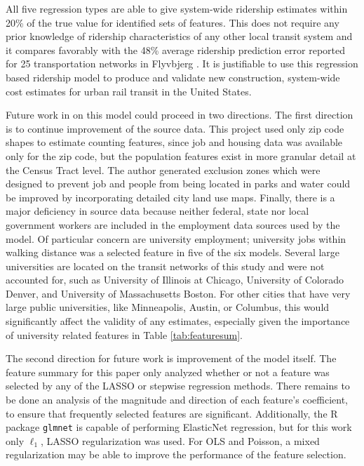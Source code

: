 \documentclass[11pt]{article}
\begin{document}
All five regression types are able to give system-wide ridership estimates within 20\% of the true value for identified sets of features. This does not require any prior knowledge of ridership characteristics of any other local transit system and it compares favorably with the 48\% average ridership prediction  error reported for 25 transportation networks in Flyvbjerg \cite{Flyvbjerg2006}. It is justifiable to use this regression based ridership model to produce and validate new construction, system-wide cost estimates for urban rail transit in the United States. 

Future work in on this model could proceed in two directions. The first direction is to continue improvement of the source data. This project used only zip code shapes to estimate counting features, since job and housing data was available only for the zip code, but the population features exist in more granular detail at the Census Tract level. The author generated exclusion zones which were designed to prevent job and people from being located in parks and water could be improved by incorporating detailed city land use maps. Finally, there is a major deficiency in source data because neither federal, state nor local government workers are included in the employment data sources used by the model. Of particular concern are university employment; university jobs within walking distance was a selected feature in five of the six models. Several large universities are located on the transit networks of this study and were not accounted for, such as University of Illinois at Chicago, University of Colorado  Denver, and University of Massachusetts Boston. For other cities that have very large public universities, like Minneapolis, Austin, or Columbus, this would significantly affect the validity of any estimates, especially given the importance of university related features in Table \ref{tab:featuresum}.

The second direction for future work is improvement of the model itself. The feature summary for this paper only analyzed whether or not a feature was selected by any of the LASSO or stepwise regression methods. There remains to be done an analysis of the magnitude and direction of each feature's coefficient, to ensure that frequently selected features are significant. Additionally, the R package \texttt{glmnet} is capable of performing ElasticNet regression, but for this work only $\ell_1$, LASSO regularization was used. For OLS and Poisson, a mixed regularization may be able to improve the performance of the feature selection. 
\end{document}
